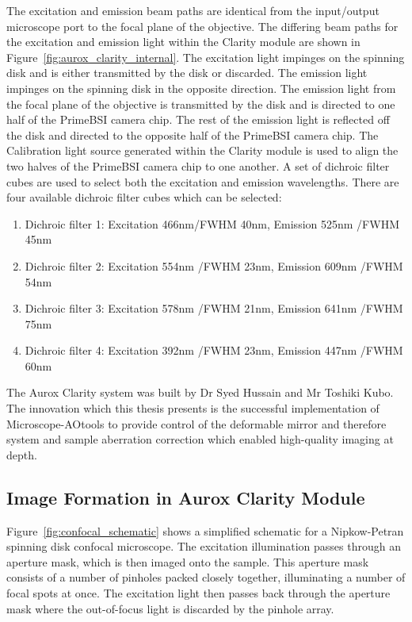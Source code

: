 The excitation and emission beam paths are identical from the input/output microscope port to the focal plane of the objective. The differing beam paths for the excitation and emission light within the Clarity module are shown in Figure~\ref{fig:aurox_clarity_internal}. The excitation light impinges on the spinning disk and is either transmitted by the disk or discarded. The emission light impinges on the spinning disk in the opposite direction. The emission light from the focal plane of the objective is transmitted by the disk and is directed to one half of the PrimeBSI camera chip. The rest of the emission light is reflected off the disk and directed to the opposite half of the PrimeBSI camera chip. The Calibration light source generated within the Clarity module is used to align the two halves of the PrimeBSI camera chip to one another. A set of dichroic filter cubes are used to select both the excitation and emission wavelengths. There are four available dichroic filter cubes which can be selected:

\begin{enumerate}
	\item Dichroic filter 1: Excitation 466nm/FWHM 40nm, Emission 525nm /FWHM 45nm
	\item Dichroic filter 2: Excitation 554nm /FWHM 23nm, Emission 609nm /FWHM 54nm
	\item Dichroic filter 3: Excitation 578nm /FWHM 21nm, Emission 641nm /FWHM 75nm
	\item Dichroic filter 4: Excitation 392nm /FWHM 23nm, Emission 447nm /FWHM 60nm  
\end{enumerate}

The Aurox Clarity system was built by Dr Syed Hussain and Mr Toshiki Kubo. The innovation which this thesis presents is the successful implementation of Microscope-AOtools to provide control of the deformable mirror and therefore system and sample aberration correction which enabled high-quality imaging at depth.

\subsection{Image Formation in Aurox Clarity Module}
\label{sec:Aurox_image_formation}

Figure~\ref{fig:confocal_schematic} shows a simplified schematic 
for a Nipkow-Petran spinning disk confocal microscope. The 
excitation illumination passes through an aperture mask, which is 
then imaged onto the sample. This aperture mask consists of a 
number of pinholes packed closely together, illuminating a number 
of focal spots at once. The excitation light then passes back 
through the aperture mask where the out-of-focus light is 
discarded by the pinhole array\cite{egger1967new,fuseler2018types}.

